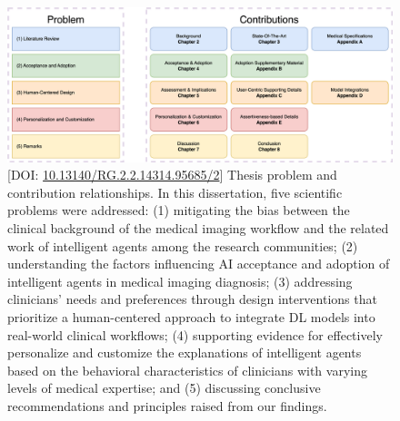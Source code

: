 \begin{figure}[ht]
\centering
\includegraphics[width=\textwidth]{images/fig115}
\caption{[DOI: \protect\href{https://www.doi.org/10.13140/RG.2.2.14314.95685/2}{10.13140/RG.2.2.14314.95685/2}] Thesis problem and contribution relationships. In this dissertation, five scientific problems were addressed: (1) mitigating the bias between the clinical background of the medical imaging workflow and the related work of intelligent agents among the research communities; (2) understanding the factors influencing AI acceptance and adoption of intelligent agents in medical imaging diagnosis; (3) addressing clinicians' needs and preferences through design interventions that prioritize a human-centered approach to integrate DL models into real-world clinical workflows; (4) supporting evidence for effectively personalize and customize the explanations of intelligent agents based on the behavioral characteristics of clinicians with varying levels of medical expertise; and (5) discussing conclusive recommendations and principles raised from our findings.}
\label{fig:fig115}
\end{figure}

